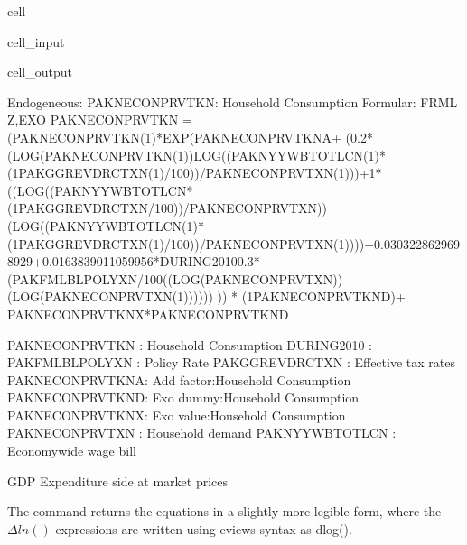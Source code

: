 \documentclass[letterpaper,10pt,english]{jupyterBook}
\begin{document}
\begin{sphinxuseclass}{cell}\begin{sphinxVerbatimInput}

\begin{sphinxuseclass}{cell_input}
\begin{sphinxVerbatim}[commandchars=\\\{\}]
\PYG{p}{[}\PYG{p}{]}
\end{sphinxVerbatim}

\end{sphinxuseclass}\end{sphinxVerbatimInput}
\begin{sphinxVerbatimOutput}

\begin{sphinxuseclass}{cell_output}
\begin{sphinxVerbatim}[commandchars=\\\{\}]
Endogeneous: PAKNECONPRVTKN: Household Consumption
Formular: FRML \PYGZlt{}Z,EXO\PYGZgt{} PAKNECONPRVTKN = (PAKNECONPRVTKN(\PYGZhy{}1)*EXP(\PYGZhy{}PAKNECONPRVTKN\PYGZus{}A+ (\PYGZhy{}0.2*(LOG(PAKNECONPRVTKN(\PYGZhy{}1))\PYGZhy{}LOG((PAKNYYWBTOTLCN(\PYGZhy{}1)*(1\PYGZhy{}PAKGGREVDRCTXN(\PYGZhy{}1)/100))/PAKNECONPRVTXN(\PYGZhy{}1)))+1*((LOG((PAKNYYWBTOTLCN*(1\PYGZhy{}PAKGGREVDRCTXN/100))/PAKNECONPRVTXN))\PYGZhy{}(LOG((PAKNYYWBTOTLCN(\PYGZhy{}1)*(1\PYGZhy{}PAKGGREVDRCTXN(\PYGZhy{}1)/100))/PAKNECONPRVTXN(\PYGZhy{}1))))+0.0303228629698929+0.0163839011059956*DURING\PYGZus{}2010\PYGZhy{}0.3*(PAKFMLBLPOLYXN/100\PYGZhy{}((LOG(PAKNECONPRVTXN))\PYGZhy{}(LOG(PAKNECONPRVTXN(\PYGZhy{}1)))))) )) * (1\PYGZhy{}PAKNECONPRVTKN\PYGZus{}D)+ PAKNECONPRVTKN\PYGZus{}X*PAKNECONPRVTKN\PYGZus{}D  \PYGZdl{}

PAKNECONPRVTKN  : Household Consumption
DURING\PYGZus{}2010     : 
PAKFMLBLPOLYXN  : Policy Rate
PAKGGREVDRCTXN  : Effective tax rates
PAKNECONPRVTKN\PYGZus{}A: Add factor:Household Consumption
PAKNECONPRVTKN\PYGZus{}D: Exo dummy:Household Consumption
PAKNECONPRVTKN\PYGZus{}X: Exo value:Household Consumption
PAKNECONPRVTXN  : Household demand
PAKNYYWBTOTLCN  : Economy\PYGZhy{}wide wage bill
\end{sphinxVerbatim}

\begin{sphinxVerbatim}[commandchars=\\\{\}]
\PYGZsq{}GDP Expenditure side at market prices\PYGZsq{}
\end{sphinxVerbatim}

\end{sphinxuseclass}\end{sphinxVerbatimOutput}

\end{sphinxuseclass}
\sphinxAtStartPar
The  command returns the equations in a slightly more legible form, where the \(\Delta ln()\) expressions are written using eviews syntax as dlog().
\end{document}
